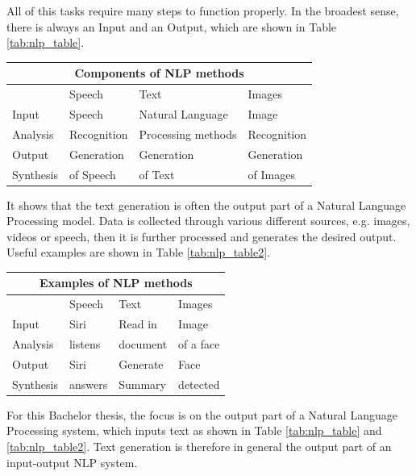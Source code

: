 All of this tasks require many steps to function properly. In the broadest sense, there is always an Input and an Output, which are shown in Table \ref{tab:nlp_table}.

\begin{center} 
	\begin{tabular}{ |p{3cm}||p{3cm}|p{3cm}|p{3cm}|}
		\hline
		\multicolumn{4}{|c|}{\textbf{Components of NLP methods}}\\ \hline\hline
		&Speech &Text &Images \\ \hline
		Input &Speech &Natural Language &Image \\
		Analysis &Recognition  &Processing methods     &Recognition \\ \hline \hline
		Output &Generation &\cellcolor[HTML]{F3E687}Generation &Generation \\
		Synthesis &of Speech & \cellcolor[HTML]{F3E687}of Text &of Images \\ \hline
	\end{tabular}
	\label{tab:nlp_table}
\end{center}

It shows that the text generation is often the output part of a Natural Language Processing model. Data is collected through various different sources, e.g. images, videos or speech, then it is further processed and generates the desired output. Useful examples are shown in Table \ref{tab:nlp_table2}.

\begin{center} 
	\begin{tabular}{ |p{3cm}||p{3cm}|p{3cm}|p{3cm}|}
		\hline
		\multicolumn{4}{|c|}{\textbf{Examples of NLP methods}}\\ \hline\hline
		&Speech &Text &Images \\ \hline
		Input &Siri &Read in &Image \\
		Analysis &listens  &document     &of a face \\ \hline \hline
		Output &Siri &\cellcolor[HTML]{F3E687}Generate &Face \\
		Synthesis &answers & \cellcolor[HTML]{F3E687}Summary &detected \\ \hline
	\end{tabular}
	\label{tab:nlp_table2}
\end{center}

For this Bachelor thesis, the focus is on the output part of a Natural Language Processing system, which inputs text as shown in Table \ref{tab:nlp_table} and \ref{tab:nlp_table2}. Text generation is therefore in general the output part of an input-output NLP system.

